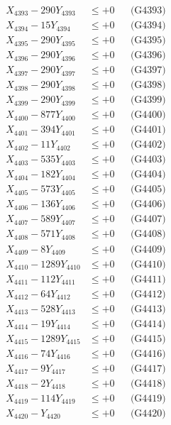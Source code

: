 \documentclass[a4paper,10pt]{article}
\begin{document}
{\begin{align}
X_{4393} - 290Y_{4393} &\leq +0 && \text{(G4393)} \\
X_{4394} - 15Y_{4394} &\leq +0 && \text{(G4394)} \\
X_{4395} - 290Y_{4395} &\leq +0 && \text{(G4395)} \\
X_{4396} - 290Y_{4396} &\leq +0 && \text{(G4396)} \\
X_{4397} - 290Y_{4397} &\leq +0 && \text{(G4397)} \\
X_{4398} - 290Y_{4398} &\leq +0 && \text{(G4398)} \\
X_{4399} - 290Y_{4399} &\leq +0 && \text{(G4399)} \\
X_{4400} - 877Y_{4400} &\leq +0 && \text{(G4400)} \\
\allowbreak
X_{4401} - 394Y_{4401} &\leq +0 && \text{(G4401)} \\
X_{4402} - 11Y_{4402} &\leq +0 && \text{(G4402)} \\
X_{4403} - 535Y_{4403} &\leq +0 && \text{(G4403)} \\
X_{4404} - 182Y_{4404} &\leq +0 && \text{(G4404)} \\
X_{4405} - 573Y_{4405} &\leq +0 && \text{(G4405)} \\
X_{4406} - 136Y_{4406} &\leq +0 && \text{(G4406)} \\
X_{4407} - 589Y_{4407} &\leq +0 && \text{(G4407)} \\
X_{4408} - 571Y_{4408} &\leq +0 && \text{(G4408)} \\
X_{4409} - 8Y_{4409} &\leq +0 && \text{(G4409)} \\
X_{4410} - 1289Y_{4410} &\leq +0 && \text{(G4410)} \\
\allowbreak
X_{4411} - 112Y_{4411} &\leq +0 && \text{(G4411)} \\
X_{4412} - 64Y_{4412} &\leq +0 && \text{(G4412)} \\
X_{4413} - 528Y_{4413} &\leq +0 && \text{(G4413)} \\
X_{4414} - 19Y_{4414} &\leq +0 && \text{(G4414)} \\
X_{4415} - 1289Y_{4415} &\leq +0 && \text{(G4415)} \\
X_{4416} - 74Y_{4416} &\leq +0 && \text{(G4416)} \\
X_{4417} - 9Y_{4417} &\leq +0 && \text{(G4417)} \\
X_{4418} - 2Y_{4418} &\leq +0 && \text{(G4418)} \\
X_{4419} - 114Y_{4419} &\leq +0 && \text{(G4419)} \\
X_{4420} - Y_{4420} &\leq +0 && \text{(G4420)} \\

\end{align}}
\end{document}
